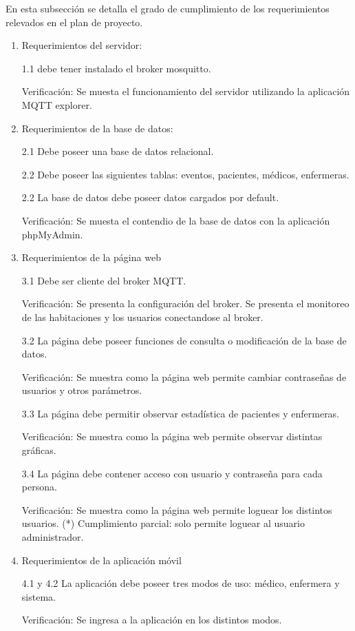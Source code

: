 En esta subsección se detalla el grado de cumplimiento de los requerimientos relevados en el plan de proyecto.
\begin{enumerate}
\item Requerimientos del servidor: 

1.1 debe tener instalado el broker mosquitto.

Verificación: Se muesta el funcionamiento del servidor utilizando la aplicación MQTT explorer.

\item Requerimientos de la base de datos: 

2.1 Debe poseer una base de datos relacional. 

2.2 Debe poseer las siguientes tablas: eventos, pacientes, médicos, enfermeras. 

2.2 La base de datos debe poseer datos cargados por default.

Verificación: Se muesta el contendio de la base de datos con la aplicación phpMyAdmin.

\item Requerimientos de la página web 

3.1 Debe ser cliente del broker MQTT. 

Verificación: Se presenta la configuración del broker. Se presenta el monitoreo de las habitaciones y los usuarios conectandose al broker.

3.2 La página debe poseer funciones de consulta o modificación de la base de datos.

Verificación: Se muestra como la página web permite cambiar contraseñas de usuarios y otros parámetros.

3.3 La página debe permitir observar estadística de pacientes y enfermeras.

Verificación: Se muestra como la página web permite observar distintas gráficas.

3.4 La página debe contener acceso con usuario y contraseña para cada persona.


Verificación: Se muestra como la página web permite loguear los distintos usuarios.
(*) Cumplimiento parcial: solo permite loguear al usuario administrador.

\item Requerimientos de la aplicación móvil

4.1 y 4.2 La aplicación debe poseer tres modos de uso: médico, enfermera y sistema. 

Verificación: Se ingresa a la aplicación en los distintos modos.


\end{enumerate}
